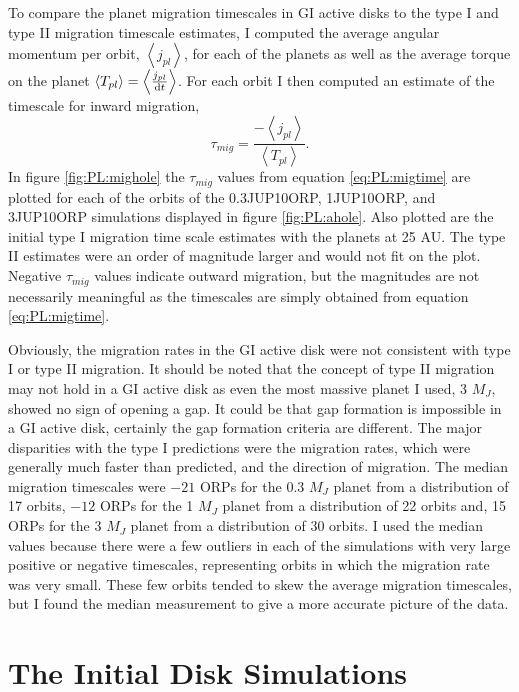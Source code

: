 To compare the planet migration timescales in GI active disks to the type I and type II migration timescale estimates, I computed the average angular momentum per orbit, $\left< j_{pl} \right >$, for each of the planets as well as the average torque on the planet $\left< T_{pl} \right> = \left< \frac{j_{pl}}{\mathrm{d} t} \right>$. For each orbit I then computed an estimate of the timescale for inward migration,
\begin{equation}
\tau_{mig} = \frac{-\left< j_{pl} \right>}{\left < T_{pl} \right >}.
\label{eq:PL:migtime}
\end{equation}
In figure \ref{fig:PL:mighole} the $\tau_{mig}$ values from equation \eqref{eq:PL:migtime} are plotted for each of the orbits of the 0.3JUP10ORP, 1JUP10ORP, and 3JUP10ORP simulations displayed in figure \ref{fig:PL:ahole}. Also plotted are the initial type I migration time scale estimates with the planets at 25 AU. The type II estimates were an order of magnitude larger and would not fit on the plot. Negative $\tau_{mig}$ values indicate outward migration, but the magnitudes are not necessarily meaningful as the timescales are simply obtained from equation \eqref{eq:PL:migtime}.

Obviously, the migration rates in the GI active disk were not consistent with type I or type II migration. It should be noted that the concept of type II migration may not hold in a GI active disk as even the most massive planet I used, 3 $M_J$, showed no sign of opening a gap. It could be that gap formation is impossible in a GI active disk, certainly the gap formation criteria are different. The major disparities with the type I predictions were the migration rates, which were generally much faster than predicted, and the direction of migration. The median migration timescales were $-21$ ORPs for the 0.3 $M_J$ planet from a distribution of 17 orbits, $-12$ ORPs for the 1 $M_J$ planet from a distribution of 22 orbits and, 15 ORPs for the 3 $M_J$ planet from a distribution of 30 orbits. I used the median values because there were a few outliers in each of the simulations with very large positive or negative timescales, representing orbits in which the migration rate was very small. These few orbits tended to skew the average migration timescales, but I found the median measurement to give a more accurate picture of the data.


\section{The Initial Disk Simulations}\label{sec:PL:0ORP}


